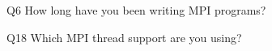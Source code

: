 \begin{description}%
\item{Q6} How long have you been writing MPI programs?%
\item{Q18} Which MPI thread support are you using?%
\end{description}%
